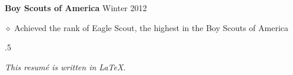 \documentclass[executivepaper]{extarticle}
\begin{document}
\begin{center}
{\begin{minipage}{7.0in}
{\noindent \textbf{\fontsize{12}{8}\selectfont Boy Scouts of America}} {\hfill \fontsize{10}{8}\selectfont Winter 2012}

\vspace{1mm}

{\noindent $\diamond$ {\fontsize{12}{8}\selectfont Achieved the rank of Eagle Scout, the highest in the Boy Scouts of America}}

\vspace{5mm}



\moveleft.5\hoffset\centerline{{\large\sl This resumé is written in \LaTeX.}}

\end{minipage}

}

\end{center}
\end{document}
